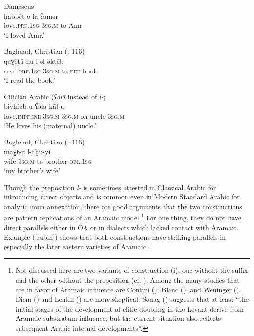 \documentclass[output=paper]{langsci/langscibook}
\begin{document}
\ea
{Damascus \citep[144]{Berlinches2016}} \\
\gll ḥabbēt-o la-ʕamər\\
     love.\textsc{prf.1sg}-\textsc{3sg.m} to-Amr\\
\glt ‘I loved Amr.’ \label{damas}
\z

\ea\label{ex:prochazka:} 
{Baghdad, Christian (\citealt{Abu-Haidar1991}: 116)}\\
\gll  qaɣētū-nu l-əl-əktēb\\
     read.\textsc{prf.1sg}{}-\textsc{3sg.m} to-\textsc{def}{}-book\\
\glt ‘I read the book.’
\z

\ea\label{ex:prochazka:} 
{Cilician Arabic (\textit{ʕalā} instead of \textit{l-}; \citealt[158]{Procházka2002Cukurova}}\\
\gll   biyḥibb-u ʕala ḫāl-u\\
     love.\textsc{impf.ind.3sg.m}{}-\textsc{3sg.m} on uncle-\textsc{3sg.m}\\
\glt ‘He loves his (maternal) uncle.’ \label{cilic}
\z

\ea\label{ex:prochazka:} 
{Baghdad, Christian (\citealt{Abu-Haidar1991}: 116)} \\
\gll maɣt-u l-aḫū-yi\\
     wife\textsc{-3sg.m} to-brother-\textsc{obl.1sg}\\
\glt ‘my brother’s wife’ \label{christ}
\z

Though the preposition \textit{l-} is sometimes attested in Classical Arabic for introducing direct objects and is common even in Modern Standard Arabic for analytic noun annexation, there are good arguments that the two constructions are pattern replications of an Aramaic model.\footnote{Not discussed here are two variants of construction (i), one without the suffix and the other without the preposition (cf. \citealt[203]{Lentin2018}). Among the many studies that are in favor of Aramaic influence are Contini (\citeyear[105]{Contini1999}); Blanc (\citeyear[130]{Blanc1964}); and Weninger (\citeyear[750]{Weninger2011Aramaic}). Diem (\citeyear[47--49]{Diem1979}) and Lentin (\citeyear{Lentin2018}) are more skeptical. Souag (\citeyear[52]{Souag2017clitic}) suggests that at least “the initial stages of the development of clitic doubling in the Levant derive from Aramaic substratum influence, but the current situation also reflects subsequent Arabic-internal developments”.} For one thing, they do not have direct parallels either in OA or in dialects which lacked contact with Aramaic. Example (\ref{rubin}) shows that both constructions have striking parallels in especially the later eastern varieties of Aramaic \citep[94--104]{Rubin2005}. 
\end{document}
